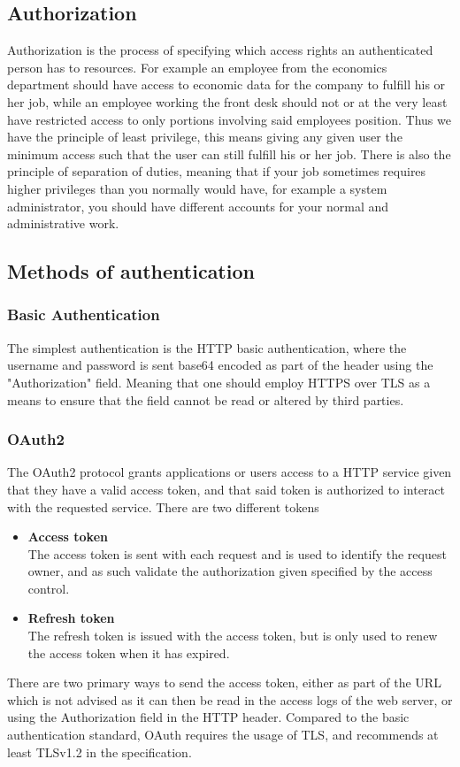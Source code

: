 \documentclass[../main.tex]{subfiles}
\begin{document}
\subsection*{Authorization}
Authorization is the process of specifying which access rights an authenticated person has to resources. For example an employee from the economics department should have access to economic data for the company to fulfill his or her job, while an employee working the front desk should not or at the very least have restricted access to only portions involving said employees position. Thus we have the principle of least privilege, this means giving any given user the minimum access such that the user can still fulfill his or her job. \cite[p. 153]{comptia_sec} There is also the principle of separation of duties, meaning that if your job sometimes requires higher privileges than you normally would have, for example a system administrator, you should have different accounts for your normal and administrative work.

\subsection{Methods of authentication}
\subsubsection*{Basic Authentication}
The simplest authentication is the HTTP basic authentication, where the username and password is sent base64 encoded as part of the header using the "Authorization" field. Meaning that one should employ HTTPS over TLS as a means to ensure that the field cannot be read or altered by third parties.
\subsubsection*{OAuth2}
The OAuth2 protocol grants applications or users access to a HTTP service given that they have a valid access token, and that said token is authorized to interact with the requested service. There are two different tokens
\begin{itemize}
    \item \textbf{Access token}\\
            The access token is sent with each request and is used to identify the request owner, and as such validate the authorization given specified by the access control.
    \item \textbf{Refresh token}\\
            The refresh token is issued with the access token, but is only used to renew the access token when it has expired.
\end{itemize}
There are two primary ways to send the access token, either as part of the URL which is not advised as it can then be read in the access logs of the web server, or using the Authorization field in the HTTP header. Compared to the basic authentication standard, OAuth requires the usage of TLS, and recommends at least TLSv1.2 in the specification. \cite{oauth_rfc}
\end{document}
